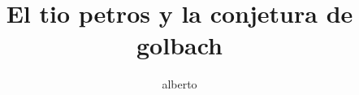 \documentclass[12pt,a4paper]{article}
\author{alberto}
\begin{document}
\title{El tio petros y la conjetura de golbach}
\end{document}
